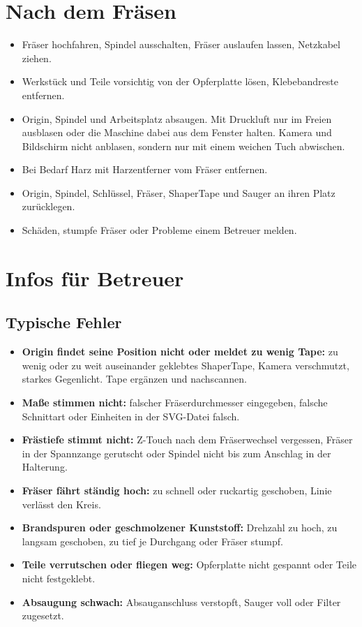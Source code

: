 \documentclass{\basedir/fablab-document}
\begin{document}
	\section{Nach dem Fräsen}

	\begin{itemize}
		\item Fräser hochfahren, Spindel ausschalten, Fräser auslaufen lassen, Netzkabel ziehen.
		\item Werkstück und Teile vorsichtig von der Opferplatte lösen, Klebebandreste entfernen.
		\item Origin, Spindel und Arbeitsplatz absaugen. Mit Druckluft nur im Freien ausblasen oder die Maschine dabei aus dem Fenster halten. Kamera und Bildschirm nicht anblasen, sondern nur mit einem weichen Tuch abwischen.
		\item Bei Bedarf Harz mit Harzentferner vom Fräser entfernen.
		\item Origin, Spindel, Schlüssel, Fräser, ShaperTape und Sauger an ihren Platz zurücklegen.
		\item Schäden, stumpfe Fräser oder Probleme einem Betreuer melden.
	\end{itemize}

	\section{Infos für Betreuer}

	\subsection{Typische Fehler}
	\begin{itemize}
		\item \textbf{Origin findet seine Position nicht oder meldet zu wenig Tape:} zu wenig oder zu weit auseinander geklebtes ShaperTape, Kamera verschmutzt, starkes Gegenlicht. Tape ergänzen und nachscannen.
		\item \textbf{Maße stimmen nicht:} falscher Fräserdurchmesser eingegeben, falsche Schnittart oder Einheiten in der SVG-Datei falsch.
		\item \textbf{Frästiefe stimmt nicht:} Z-Touch nach dem Fräserwechsel vergessen, Fräser in der Spannzange gerutscht oder Spindel nicht bis zum Anschlag in der Halterung.
		\item \textbf{Fräser fährt ständig hoch:} zu schnell oder ruckartig geschoben, Linie verlässt den Kreis.
		\item \textbf{Brandspuren oder geschmolzener Kunststoff:} Drehzahl zu hoch, zu langsam geschoben, zu tief je Durchgang oder Fräser stumpf.
		\item \textbf{Teile verrutschen oder fliegen weg:} Opferplatte nicht gespannt oder Teile nicht festgeklebt.
		\item \textbf{Absaugung schwach:} Absauganschluss verstopft, Sauger voll oder Filter zugesetzt.
	\end{itemize}
\end{document}
